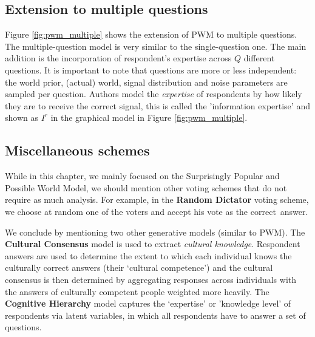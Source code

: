 \documentclass{report}
\theoremstyle{definition}
\begin{document}
\subsection{Extension to multiple questions}
Figure \ref{fig:pwm_multiple} shows the extension of PWM to multiple questions. The multiple-question model is very similar to the single-question one. The main addition is the incorporation of respondent's expertise across $Q$ different questions. It is important to note that questions are more or less independent: the world prior, (actual) world, signal distribution and noise parameters are sampled per question. Authors model the \emph{expertise} of respondents  by how likely they are to receive the correct signal, this is called the 'information expertise' and shown as $I^r$ in the graphical model in Figure \ref{fig:pwm_multiple}.

\subsection{Miscellaneous schemes}
While in this chapter, we mainly focused on the Surprisingly Popular and Possible World Model, we should mention other voting schemes that do not require as much analysis. For example, in the \textbf{Random Dictator} voting scheme, we choose at random  one of the voters and accept his vote as the correct~answer. 

We conclude by mentioning two other generative models (similar to PWM). The \textbf{Cultural Consensus} model is used to extract \emph{cultural knowledge}. Respondent answers are used to determine the extent to which each individual knows the culturally correct answers (their ‘cultural competence’) and the cultural consensus is then determined by aggregating responses across individuals with the answers of culturally competent people weighted more heavily. The \textbf{Cognitive Hierarchy} model captures the `expertise' or 'knowledge level' of respondents via latent variables, in which all respondents have to answer a set of questions.
\end{document}
